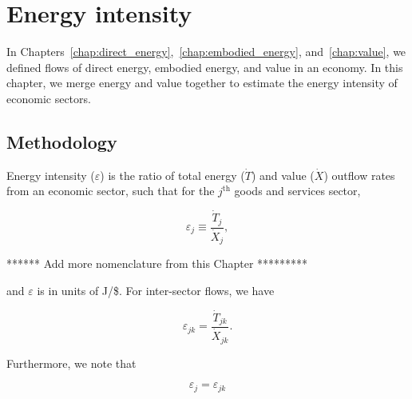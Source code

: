 %
%
%
\chapter{Energy intensity}
\label{chap:intensity} %

In Chapters~\ref{chap:direct_energy},~\ref{chap:embodied_energy}, and~\ref{chap:value}, 
we defined flows of direct energy, embodied energy, and value in an economy.
In this chapter, we merge energy and value together to estimate
the energy intensity of economic sectors.


\section{Methodology}

Energy intensity ($\varepsilon$) is the ratio 
of total energy ($\dot{T}$) and value ($\dot{X}$) outflow rates 
from an economic sector, 
such that for the $j^{\mathrm{th}}$ goods and services sector,

\begin{equation} \label{eq:epsilon_output_def_g_and_s}
	\varepsilon_{j} \equiv \frac{\dot{T}_{j}}{\dot{X}_{j}},
\end{equation} 

****** Add more nomenclature from this Chapter *********

\noindent{}and $\varepsilon$ is in units of J/\$. 
For inter-sector flows, we have

\begin{equation} \label{eq:epsilon_transfers_1}
	\varepsilon_{jk} = \frac{\dot{T}_{jk}}{\dot{X}_{jk}}.
\end{equation}

Furthermore, we note that 

\begin{equation} \label{eq:epsilon_equiv_1}
	\varepsilon_{j} = \varepsilon_{jk}
\end{equation}

